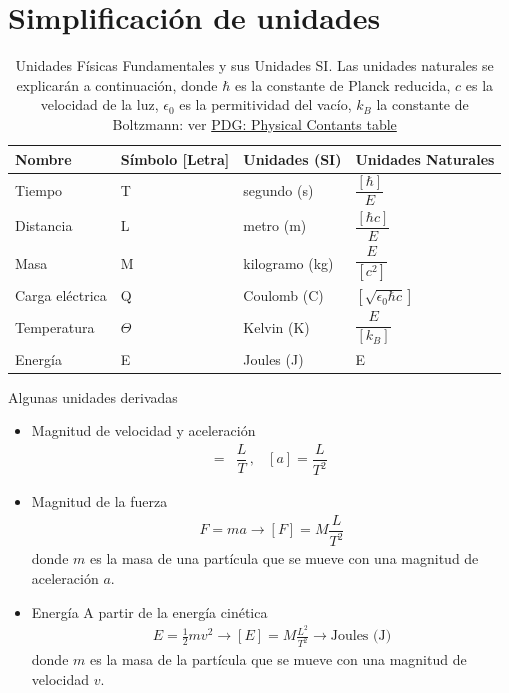 \documentclass[11pt,a4paper]{book}
\begin{document}
\section{Simplificación de unidades}

\begin{table}[h!]
    \centering
    \caption{Unidades Físicas Fundamentales y sus Unidades SI. Las unidades naturales se explicarán a continuación, donde $\hbar$ es la constante de Planck reducida, $c$ es la velocidad de la luz, $\epsilon_0$ es la permitividad del vacío,  $k_B$ la constante de Boltzmann: ver \href{https://pdg.lbl.gov/2024/reviews/rpp2024-rev-phys-constants.pdf}{PDG: Physical Contants table}}
    \begin{tabular}{|l|l|l|p{2cm}|}
        \hline
       \textbf{Nombre}           &\textbf{Símbolo}  [Letra] & \textbf{Unidades} (SI) &  \textbf{Unidades Naturales} \\ \hline
        Tiempo          & T               & segundo (s) & $\dfrac{[\hbar]}{\unit{E}}$   \\ \hline
        Distancia       & L               & metro (m)   & $\dfrac{[\hbar c]}{\unit{E}}$ \\ \hline
        Masa            & M               & kilogramo (kg) & $\dfrac{\unit{E}}{[c^2]}$ \\ \hline
        Carga eléctrica & Q               & Coulomb (C)  & 
        $\left[\sqrt{\epsilon_0 \hbar c}\right]$\\ \hline
        Temperatura      & $\Theta$               & Kelvin (K) &   $\dfrac{\unit{E}}{[k_B]}$\\ \hline
        Energía     & E               & Joules (J) & E   \\ \hline
    \end{tabular}
    \label{tab:cantidades_fisicas}
\end{table}

\newpage

Algunas unidades derivadas
\begin{itemize}
\item Magnitud de velocidad y aceleración
\begin{align*}
    [v] =& \dfrac{\unit{L}}{\unit{T}}\,, & [a] = \dfrac{\unit{L}}{\unit{T}^2}\,
\end{align*}
    \item Magnitud de la fuerza
    \begin{align*}
        F = m a \to [F] =\unit{M} \dfrac{\unit{L}}{\unit{T}^2}
    \end{align*}
    donde $m$ es la masa de una partícula que se mueve con una magnitud de aceleración $a$.
    \item Energía
    A partir de la energía cinética
    \begin{align*}
        E = \frac{1}{2}m v^2 \to [E] = \unit{M}\frac{\unit{L}^2}{\unit{T}^2} \to \text{Joules (J)}
    \end{align*}
    donde $m$ es la masa de la partícula que se mueve con una magnitud de velocidad $v$.
\end{itemize}
\end{document}
